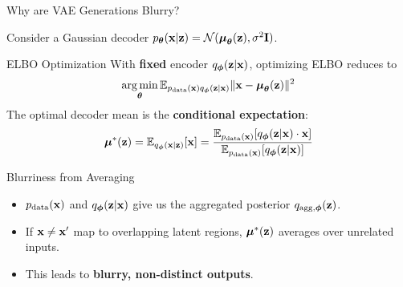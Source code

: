 \documentclass{beamer}
\begin{document}
\begin{frame}{Why are VAE Generations Blurry?}
	
	Consider a Gaussian decoder $p_{\boldsymbol{\theta}}(\mathbf{x} | \mathbf{z}) = \mathcal{N}(\boldsymbol{\mu}_{\boldsymbol{\theta}}(\mathbf{z}), \sigma^2 \mathbf{I})$.
	\eqpause
	\begin{block}{ELBO Optimization}
		With \textbf{fixed} encoder $q_{\boldsymbol{\phi}}(\mathbf{z} | \mathbf{x})$, optimizing ELBO reduces to
		\vspace{-0.3cm}
		\[
			\operatorname*{arg\,min}_{\boldsymbol{\theta}} \mathbb{E}_{p_{\text{data}}(\mathbf{x}) q_{\boldsymbol{\phi}}(\mathbf{z} | \mathbf{x})} \| \mathbf{x} - \boldsymbol{\mu}_{\boldsymbol{\theta}}(\mathbf{z}) \|^2
		\]
		The optimal decoder mean is the \textbf{conditional expectation}:
		\vspace{-0.3cm}
		\[
			\boldsymbol{\mu}^*(\mathbf{z}) = \mathbb{E}_{q_{\boldsymbol{\phi}}(\mathbf{x} | \mathbf{z})}[\mathbf{x}] = \frac{\mathbb{E}_{p_{\text{data}}(\mathbf{x})}[q_{\boldsymbol{\phi}}(\mathbf{z} | \mathbf{x}) \cdot \mathbf{x}]}{\mathbb{E}_{p_{\text{data}}(\mathbf{x})}[q_{\boldsymbol{\phi}}(\mathbf{z} | \mathbf{x})]}
		\]
		\vspace{-0.7cm}
	\end{block}
	\eqpause
	\begin{block}{Blurriness from Averaging}
		\begin{itemize}
			\item $p_{\text{data}}(\mathbf{x})$ and $q_{\boldsymbol{\phi}}(\mathbf{z} | \mathbf{x})$ give us the aggregated posterior $q_{\text{agg}, \boldsymbol{\phi}}(\mathbf{z})$.
			\item If $\mathbf{x} \neq \mathbf{x}'$ map to overlapping latent regions, $\boldsymbol{\mu}^*(\mathbf{z})$ averages over unrelated inputs.
			\item This leads to \textbf{blurry, non-distinct outputs}.
		\end{itemize}
	\end{block}
\end{frame}
\end{document}
